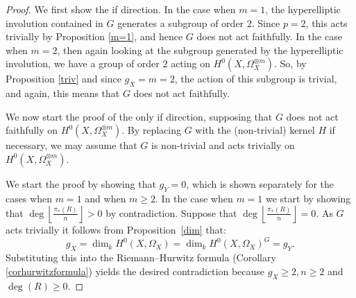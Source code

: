     \begin{proof}
    We first show the if direction. 
    In the case when $m=1$, the hyperelliptic involution contained in $G$ generates a subgroup of order $2$.
    Since $p=2$, this acts trivially by Proposition \ref{m=1}, and hence $G$ does not act faithfully.
    In the case when $m=2$, then again looking at the subgroup generated by the hyperelliptic involution, we have a group of order $2$ acting on $H^0(X,\Omega_X^{\otimes m})$.
    So, by Proposition \ref{triv} and since $g_X=m=2$, the action of this subgroup is trivial, and again, this means that $G$ does not act faithfully.
    
    
    We now start the proof of the only if direction, supposing that $G$ does not act faithfully on $H^0(X,\Omega_X^{\otimes m})$. 
    By replacing $G$ with the (non-trivial) kernel $H$ if necessary, we may assume that $G$ is non-trivial and acts trivially on $H^0(X,\Omega_X^{\otimes m})$.
    
    
    We start the proof by showing that $g_Y=0$, which is shown separately for the cases when $m=1$ and when $m\geq 2$.
    In the case when $m=1$ we start by showing that $\deg  \left\lfloor \frac {\pi_*(R)}{n} \right\rfloor >0$ by contradiction.
    Suppose that $\deg\left\lfloor \frac{\pi_*(R)}{n} \right\rfloor =0$.
    As $G$ acts trivially it follows from Proposition~\ref{dim} that:
        \begin{equation*}
        g_X=\dim_k H^0(X,\Omega_X)=\dim_k H^0(X,\Omega_X)^G=g_Y.
        \end{equation*}
    Substituting this into the Riemann--Hurwitz formula (Corollary \ref{corhurwitzformula}) yields the desired contradiction because $g_X\geq 2, n\geq 2$ and $\deg(R)\geq 0$.
    

\end{proof}
